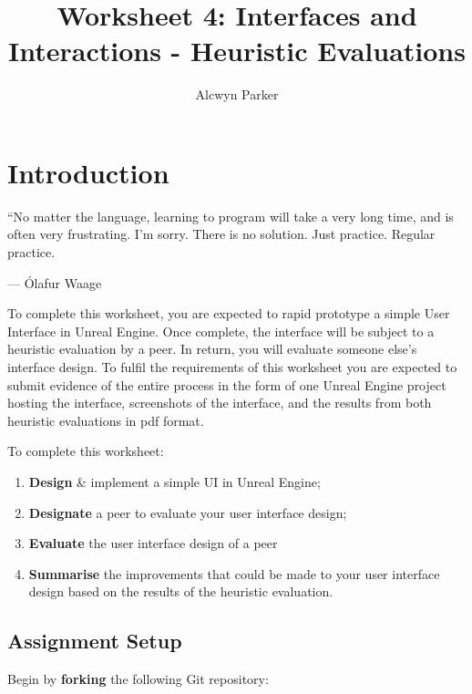 \documentclass{../../../fal_assignment}
\title{Worksheet 4: Interfaces and Interactions - Heuristic Evaluations}
\author{Alcwyn Parker	}
\begin{document}
\maketitle

\section*{Introduction}

\begin{marginquote}
``No matter the language, learning to program will take a very long time, and is often very frustrating. I'm sorry. There is no solution. Just practice. Regular practice.

\par --- \'Olafur Waage
\end{marginquote}

To complete this worksheet, you are expected to rapid prototype a simple User Interface in Unreal Engine. Once complete, the interface will be subject to a heuristic evaluation by a peer. In return, you will evaluate someone else's interface design. To fulfil the requirements of this worksheet you are expected to submit evidence of the entire process in the form of one Unreal Engine project hosting the interface, screenshots of the interface, and the results from both heuristic evaluations in pdf format. 

To complete this worksheet: 

\begin{enumerate}[label=(\roman*)]
    \item \textbf{Design} \& {implement} a simple UI in Unreal Engine;
    \item \textbf{Designate} a peer to evaluate your user interface design;
    \item \textbf{Evaluate} the user interface design of a peer
    \item \textbf{Summarise} the improvements that could be made to your user interface design based on the results of the heuristic evaluation. 
\end{enumerate}

\subsection*{Assignment Setup} 

Begin by \textbf{forking} the following Git repository: 
\end{document}
